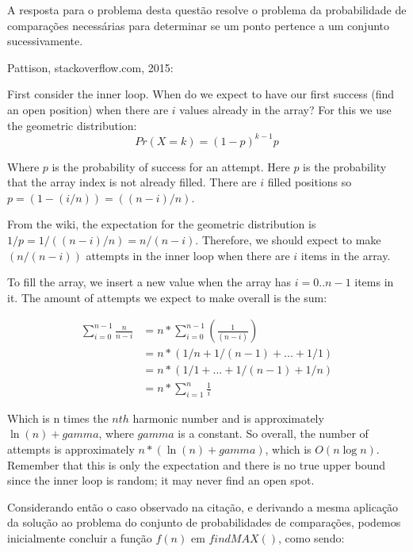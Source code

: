 \documentclass[12pt,a4paper]{article}
\begin{document}
A resposta para o problema desta questão resolve o problema da probabilidade de comparações necessárias para determinar se um ponto pertence a um conjunto sucessivamente.

Pattison, stackoverflow.com, 2015:

\begin{quoting}[rightmargin=0cm,leftmargin=4cm]
	\begin{singlespace}
	{\footnotesize  
	First consider the inner loop. When do we expect to have our first success (find an open position) when there are $i$ values already in the array? For this we use the geometric distribution:
	\[Pr(X = k) = (1-p)^{k-1} p\]
	
	Where $p$ is the probability of success for an attempt. Here $p$ is the probability that the array index is not already filled. There are $i$ filled positions so $p = (1 - (i/n)) = ((n - i)/n)$.
	
	From the wiki, the expectation for the geometric distribution is $1/p = 1 / ((n-i)/n) = n/(n-i)$. Therefore, we should expect to make $(n / (n - i))$ attempts in the inner loop when there are $i$ items in the array.
	
	To fill the array, we insert a new value when the array has $i=0..n-1$ items in it. The amount of attempts we expect to make overall is the sum:
	
	\[ \begin{split}
	\sum_{i=0}^{n-1} \frac{n}{n-i}&= n * \sum_{i=0}^{n-1} (\frac{1}{(n-i)})\\
	&= n * (1/n + 1/(n-1) + ... + 1/1) \\
	&= n * (1/1 + ... + 1/(n-1) + 1/n) \\
	&= n * \sum_{i=1}^{n} \frac{1}{i}
	\end{split} \]
	
	Which is n times the $nth$ harmonic number and is approximately $\ln(n) + gamma$, where $gamma$ is a constant. So overall, the number of attempts is approximately $n * (\ln(n) + gamma)$, which is $O(n \log n)$. Remember that this is only the expectation and there is no true upper bound since the inner loop is random; it may never find an open spot.
	}
	\end{singlespace}
\end{quoting}

Considerando então o caso observado na citação, e derivando a mesma aplicação da solução ao problema do conjunto de probabilidades de comparações, podemos inicialmente concluir a função $f(n)$ em $findMAX()$, como sendo:
\end{document}
